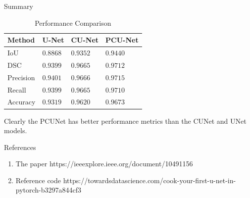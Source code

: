 \documentclass{beamer}
\begin{document}
\begin{frame}{Summary}
    \begin{table}[htbp]
        \centering
        \label{tab:performance}
        \begin{tabular}{|l|l|l|l|}
        \hline
        \textbf{Method} & \textbf{U-Net} & \textbf{CU-Net} & \textbf{PCU-Net} \\ \hline
        IoU              & $0.8868$ & $0.9352$ & $0.9440$ \\ \hline
        DSC              & $0.9399$ & $0.9665$ & $0.9712$ \\ \hline
        Precision        & $0.9401$ & $0.9666$ & $0.9715$ \\ \hline
        Recall           & $0.9399$ & $0.9665$ & $0.9710$ \\ \hline
        Accuracy         & $0.9319$ & $0.9620$ & $0.9673$ \\ \hline
        \end{tabular}
        \caption{Performance Comparison}

        \end{table}
        Clearly the PCUNet has better performance metrics than the CUNet and UNet models.
\end{frame}

\begin{frame}{References}
    \begin{enumerate}
        \item The paper https://ieeexplore.ieee.org/document/10491156
        \item Reference code https://towardsdatascience.com/cook-your-first-u-net-in-pytorch-b3297a844cf3
    \end{enumerate}
\end{frame}
\end{document}
